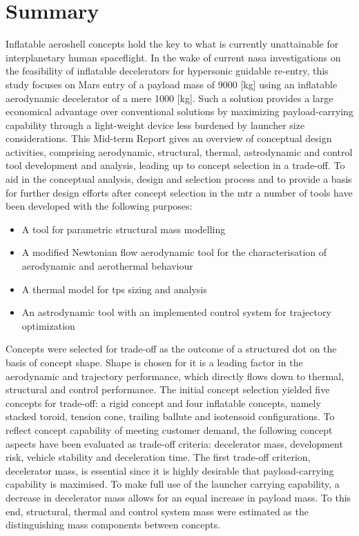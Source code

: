\section*{Summary}\label{cha:summary}


Inflatable aeroshell concepts hold the key to what is currently unattainable for interplanetary human spaceflight. In the wake of current \acrfull{nasa} investigations on the feasibility of inflatable decelerators for hypersonic guidable re-entry, this study focuses on Mars entry of a payload mass of 9000 [kg] using an inflatable aerodynamic decelerator of a mere 1000 [kg]. Such a solution provides a large economical advantage over conventional solutions by maximizing payload-carrying capability through a light-weight device less burdened by launcher size considerations. This Mid-term Report gives an overview of conceptual design activities, comprising aerodynamic, structural, thermal, astrodynamic and control tool development and analysis, leading up to concept selection in a trade-off.
\newline
\newline
To aid in the conceptual analysis, design and selection process and to provide a basis for further design efforts after concept selection in the \acrfull{mtr} a number of tools have been developed with the following purposes:
\begin{itemize}
\item A tool for parametric structural mass modelling
\item A modified Newtonian flow aerodynamic tool for the characterisation of aerodynamic and aerothermal behaviour
\item A thermal model for \acrfull{tps} sizing and analysis
\item An astrodynamic tool with an implemented control system for trajectory optimization 
\end{itemize}

Concepts were selected for trade-off as the outcome of a structured \acrfull{dot} on the basis of concept shape. Shape is chosen for it is a leading factor in the aerodynamic and trajectory performance, which directly flows down to thermal, structural and control performance. The initial concept selection yielded five concepts for trade-off: a rigid concept and four inflatable concepts, namely stacked toroid, tension cone, trailing ballute and isotensoid configurations. To reflect concept capability of meeting customer demand, the following concept aspects have been evaluated as trade-off criteria: decelerator mass, development risk, vehicle stability and deceleration time.
\newline
\newline
The first trade-off criterion, decelerator mass, is essential since it is highly desirable that payload-carrying capability is maximised. To make full use of the launcher carrying capability, a decrease in decelerator mass allows for an equal increase in payload mass. To this end, structural, thermal and control system mass were estimated as the distinguishing mass components between concepts. 

